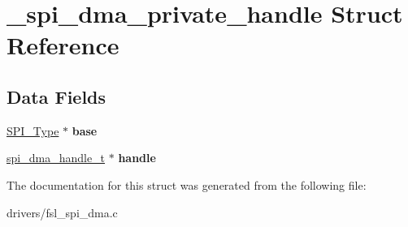 \hypertarget{struct__spi__dma__private__handle}{}\section{\+\_\+spi\+\_\+dma\+\_\+private\+\_\+handle Struct Reference}
\label{struct__spi__dma__private__handle}
\subsection*{Data Fields}
\begin{DoxyCompactItemize}
\item 
\mbox{\label{struct__spi__dma__private__handle_a3cfb786cfbe5e585b14feeaa4277eec9}} 
\mbox{\hyperlink{struct_s_p_i___type}{S\+P\+I\+\_\+\+Type}} $\ast$ {\bfseries base}
\item 
\mbox{\label{struct__spi__dma__private__handle_a7cb1b719be54684872040a74518102b3}} 
\mbox{\hyperlink{struct__spi__dma__handle}{spi\+\_\+dma\+\_\+handle\+\_\+t}} $\ast$ {\bfseries handle}
\end{DoxyCompactItemize}


The documentation for this struct was generated from the following file\+:\begin{DoxyCompactItemize}
\item 
drivers/fsl\+\_\+spi\+\_\+dma.\+c\end{DoxyCompactItemize}
